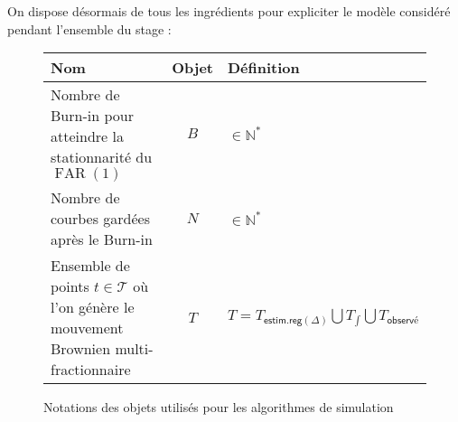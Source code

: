 On dispose désormais de tous les ingrédients pour expliciter le modèle considéré pendant l'ensemble du stage :

\begin{figure}[H]
	\noindent\begin{tabularx}{\textwidth}{XcX}
		\toprule
		\textbf{Nom}                                                                                   & \textbf{Objet} & \textbf{Définition}                                                                \\
		\midrule
		Nombre de Burn-in pour atteindre la stationnarité du $\operatorname{FAR}(1)$                   & $B$            & $\in \mathds N^*$                                                                  \\
		Nombre de courbes gardées après le Burn-in                                                     & $N$            & $\in \mathds N^*$                                                                  \\

		Ensemble de points $t \in \mathcal T$ où l'on génère le mouvement Brownien multi-fractionnaire & $T$            & $T = T_{\textsf{estim.reg}(\Delta)} \bigcup T_{\int} \bigcup T_{\textsf{observé}}$ \\

		\bottomrule
	\end{tabularx}
	\caption{Notations des objets utilisés pour les algorithmes de simulation}
	\label{tab:algo_notations}
\end{figure}


